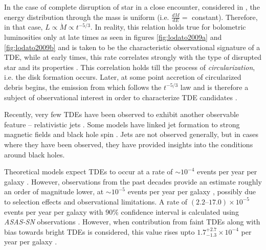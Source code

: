\documentclass{tda}
\begin{document}
\noindent In the case of complete disruption of star in a close encounter, considered in \cite{evans_tidal_1989, lodato_stellar_2009}, the energy distribution through the mass is uniform (i.e. \(\frac{dM}{dE} = \) constant). Therefore, in that case, \(L \propto \dot{M} \propto t^{-5/3}\). In reality, this relation holds true for bolometric luminosities only at late times \cite{lodato_stellar_2009, lodato_multiband_2011} as seen in figures \ref{fig:lodato2009a} and \ref{fig:lodato2009b} and is taken to be the characteristic observational signature of a TDE, while at early times, this rate correlates strongly with the type of disrupted star and its properties \cite{lodato_stellar_2009, lodato_recent_2015, guillochon_hydrodynamical_2013}. This correlation holds till the process of \emph{circularization}, i.e. the disk formation occurs. Later, at some point accretion of circularized debris begins, the emission from which follows the \(t^{-5/3}\) law and is therefore a subject of observational interest in order to characterize TDE candidates \cite{piran_disk_2015}.

Recently, very few TDEs have been observed to exhibit another observable feature -- relativistic jets \cite{lodato_recent_2015}. Some models have linked jet formation to strong magnetic fields and black hole spin \cite{dai_unified_2018}. Jets are not observed generally, but in cases where they have been observed, they have provided insights into the conditions around black holes.

Theoretical models expect TDEs to occur at a rate of \(\sim 10^{-4}\) events per year per galaxy \cite{magorrian_rates_1999}. However, observations from the past decades provide an estimate roughly an order of magnitude lower, at \(\sim 10^{-5}\) events per year per galaxy \cite{stone_rates_2016}, possibly due to selection effects and observational limitations. A rate of \((2.2–17.0) \times 10^{−5}\) events per year per galaxy with \(90\%\) confidence interval is calculated using \textit{ASAS-SN} observations \cite{holoien_six_2016}. However, when contribution from faint TDEs along with bias towards bright TDEs is considered, this value rises upto \(1.7_{-1.3}^{+2.7} \times 10^{-4}\) per year per galaxy \cite{hung_sifting_2018}. 
\end{document}
